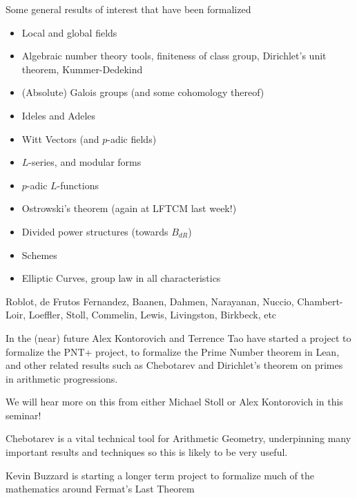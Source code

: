 \documentclass{beamer}
\theoremstyle{plain}
\begin{document}
\begin{frame}{Some general results of interest that have been formalized}
    \begin{itemize}
        \item Local and global fields
        \item Algebraic number theory tools, finiteness of class group, Dirichlet's unit theorem, Kummer-Dedekind
        \item (Absolute) Galois groups (and some cohomology thereof)
        \item Ideles and Adeles
        \item Witt Vectors (and $p$-adic fields)
        \item $L$-series, and modular forms
        \item $p$-adic $L$-functions
        \item Ostrowski's theorem (again at LFTCM last week!)
        \item Divided power structures (towards $B_{dR}$)
        \item Schemes
        \item Elliptic Curves, group law in all characteristics
    \end{itemize}
    Roblot, de Frutos Fernandez, Baanen, Dahmen, Narayanan, Nuccio, Chambert-Loir, Loeffler, Stoll, Commelin, Lewis, Livingston, Birkbeck, etc

\end{frame}


\begin{frame}{In the (near) future}
    Alex Kontorovich and Terrence Tao have started a project to formalize the PNT+ project, to formalize the Prime Number theorem in Lean, and other related results such as Chebotarev and Dirichlet's theorem on primes in arithmetic progressions.

    We will hear more on this from either Michael Stoll or Alex Kontorovich in this seminar!

    Chebotarev is a vital technical tool for Arithmetic Geometry, underpinning many important results and techniques so this is likely to be very useful.\pause

    Kevin Buzzard is starting a longer term project to formalize much of the mathematics around Fermat's Last Theorem

\end{frame}
\end{document}
